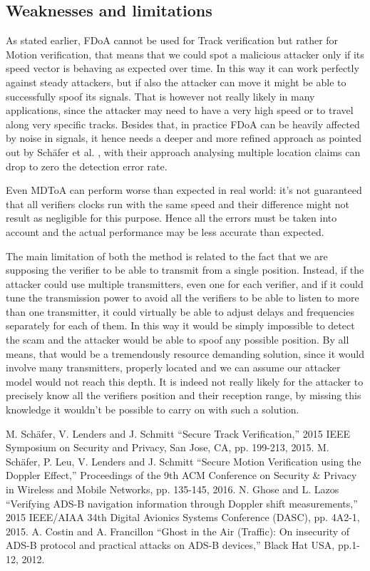\documentclass[conference]{IEEEtran}
\begin{document}
\subsection{Weaknesses and limitations}
As stated earlier, FDoA cannot be used for Track verification but rather for Motion verification, that means that we could spot a malicious attacker only if its speed vector is behaving as expected over time. In this way it can work perfectly against steady attackers, but if also the attacker can move it might be able to successfully spoof its signals. That is however not really likely in many applications, since the attacker may need to have a very high speed or to travel along very specific tracks. Besides that, in practice FDoA can be heavily affected by noise in signals, it hence needs a deeper and more refined approach as pointed out by Schäfer et al. \cite{schaefer16}, with their approach analysing multiple location claims can drop to zero the detection error rate.

Even MDToA can perform worse than expected in real world: it's not guaranteed that all verifiers clocks run with the same speed and their difference might not result as negligible for this purpose. Hence all the errors must be taken into account and the actual performance may be less accurate than expected.

The main limitation of both the method is related to the fact that we are supposing the verifier to be able to transmit from a single position. Instead, if the attacker could use multiple transmitters, even one for each verifier, and if it could tune the transmission power to avoid all the verifiers to be able to listen to more than one transmitter, it could virtually be able to adjust delays and frequencies separately for each of them. In this way it would be simply impossible to detect the scam and the attacker would be able to spoof any possible position. By all means, that would be a tremendously resource demanding solution, since it would involve many transmitters, properly located and we can assume our attacker model would not reach this depth. It is indeed not really likely for the attacker to precisely know all the verifiers position and their reception range, by missing this knowledge it wouldn't be possible to carry on with such a solution.


\begin{thebibliography}{00}
 M. Schäfer, V. Lenders and J. Schmitt ``Secure Track Verification,'' 2015 IEEE Symposium on Security and Privacy, San Jose, CA, pp. 199-213, 2015.
 M. Schäfer, P. Leu, V. Lenders and J. Schmitt ``Secure Motion Verification using the Doppler Effect,'' Proceedings of the 9th ACM Conference on Security \& Privacy in Wireless and Mobile Networks, pp. 135-145, 2016.
 N. Ghose and L. Lazos ``Verifying ADS-B navigation information through Doppler shift measurements,'' 2015 IEEE/AIAA 34th Digital Avionics Systems Conference (DASC), pp. 4A2-1, 2015.
 A. Costin and A. Francillon ``Ghost in the Air (Traffic): On insecurity of ADS-B protocol and practical attacks on ADS-B devices,'' Black Hat USA, pp.1-12, 2012.
\end{thebibliography}
\end{document}
